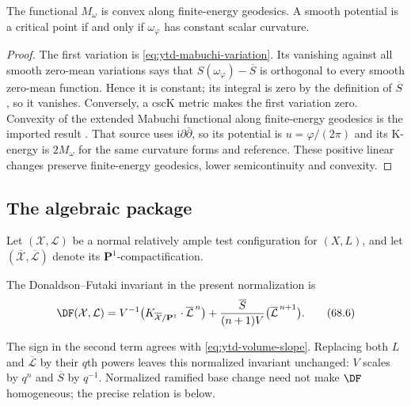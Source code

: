 \begin{proposition}\label{prop:ytd-analytic-convexity}
The functional $M_\omega$ is convex along finite-energy geodesics.
A smooth potential is a critical point if and only if
$\omega_\varphi$ has constant scalar curvature.
\end{proposition}

\begin{proof}
The first variation is \eqref{eq:ytd-mabuchi-variation}. Its vanishing
against all smooth zero-mean variations says that
$S(\omega_\varphi)-\overline S$ is orthogonal to every smooth
zero-mean function. Hence it is constant; its integral is zero by the
definition of $\overline S$, so it vanishes. Conversely, a cscK metric
makes the first variation zero. Convexity of the extended Mabuchi
functional along finite-energy geodesics is the imported result
\cite[Theorem~1.2]{BDL17}. That source uses
$\mathrm i\partial\bar\partial$, so its potential is
$u=\varphi/(2\pi)$ and its K-energy is $2M_\omega$ for the same curvature
forms and reference. These positive linear changes preserve finite-energy
geodesics, lower semicontinuity and convexity.
\end{proof}

\subsection{The algebraic package}
\label{subsec:ytd-algebraic}

Let $(\mathcal X,\mathcal L)$ be a normal relatively ample test
configuration for $(X,L)$, and let
$(\overline{\mathcal X},\overline{\mathcal L})$ denote its
$\mathbf P^1$-compactification.

\begin{definition}
\label{def:ytd-df}
The Donaldson--Futaki invariant in the present normalization is
\[
 \DF(\mathcal X,\mathcal L)
 =V^{-1}
    \bigl(K_{\overline{\mathcal X}/\mathbf P^1}
             \cdot\overline{\mathcal L}^{\,n}\bigr)
 +\frac{\overline S}{(n+1)V}
        \bigl(\overline{\mathcal L}^{\,n+1}\bigr).
\tag{68.6}\label{eq:ytd-df}
\]
\end{definition}

The sign in the second term agrees with
\eqref{eq:ytd-volume-slope}. Replacing both $L$ and $\overline{\mathcal L}$ by their $q$th powers
leaves this normalized invariant unchanged: $V$ scales by $q^n$ and
$\overline S$ by $q^{-1}$. Normalized ramified base change need not make
$\DF$ homogeneous; the precise relation is
 below.

